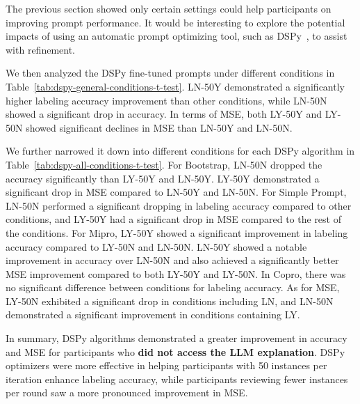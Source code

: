 The previous section showed only certain settings could help participants on improving prompt performance. It would be interesting to explore the potential impacts of using an automatic prompt optimizing tool, such as DSPy~\cite{khattab2023dspy}, to assist with refinement. 


We then analyzed the DSPy fine-tuned prompts under different conditions in Table~\ref{tab:dspy-general-conditions-t-test}. LN-50Y demonstrated a significantly higher labeling accuracy improvement than other conditions, while LN-50N showed a significant drop in accuracy. In terms of MSE, both LY-50Y and LY-50N showed significant declines in MSE than LN-50Y and LN-50N. 

We further narrowed it down into different conditions for each DSPy algorithm in Table~\ref{tab:dspy-all-conditions-t-test}. For Bootstrap, LN-50N dropped the accuracy significantly than LY-50Y and LN-50Y. LY-50Y demonstrated a significant drop in MSE compared to LN-50Y and LN-50N. 
For Simple Prompt, LN-50N performed a significant dropping in labeling accuracy compared to other conditions, and LY-50Y had a significant drop in MSE compared to the rest of the conditions.  
For Mipro, LY-50Y showed a significant improvement in labeling accuracy compared to LY-50N and LN-50N. LN-50Y showed a notable improvement in accuracy over LN-50N and also achieved a significantly better MSE improvement compared to both LY-50Y and LY-50N.
In Copro, there was no significant difference between conditions for labeling accuracy. As for MSE, LY-50N exhibited a significant drop in conditions including LN, and LN-50N demonstrated a significant improvement in conditions containing LY.

In summary, DSPy algorithms demonstrated a greater improvement in accuracy and MSE for participants who \textbf{did not access the LLM explanation}. DSPy optimizers were more effective in helping participants with 50 instances per iteration enhance labeling accuracy, while participants reviewing fewer instances per round saw a more pronounced improvement in MSE. 




